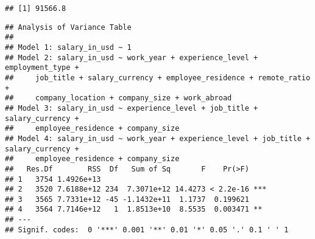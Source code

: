 \documentclass[
]{article}
\begin{document}
\begin{verbatim}
## [1] 91566.8
\end{verbatim}

\begin{verbatim}
## Analysis of Variance Table
## 
## Model 1: salary_in_usd ~ 1
## Model 2: salary_in_usd ~ work_year + experience_level + employment_type + 
##     job_title + salary_currency + employee_residence + remote_ratio + 
##     company_location + company_size + work_abroad
## Model 3: salary_in_usd ~ experience_level + job_title + salary_currency + 
##     employee_residence + company_size
## Model 4: salary_in_usd ~ work_year + experience_level + job_title + salary_currency + 
##     employee_residence + company_size
##   Res.Df        RSS  Df   Sum of Sq       F    Pr(>F)    
## 1   3754 1.4926e+13                                      
## 2   3520 7.6188e+12 234  7.3071e+12 14.4273 < 2.2e-16 ***
## 3   3565 7.7331e+12 -45 -1.1432e+11  1.1737  0.199621    
## 4   3564 7.7146e+12   1  1.8513e+10  8.5535  0.003471 ** 
## ---
## Signif. codes:  0 '***' 0.001 '**' 0.01 '*' 0.05 '.' 0.1 ' ' 1
\end{verbatim}
\end{document}
